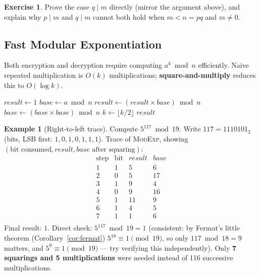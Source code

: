 \documentclass[11pt]{article}
\theoremstyle{definition}
\newtheorem{example}[theorem]{Example}
\newtheorem{exercise}[theorem]{Exercise}
\theoremstyle{remark}
\begin{document}
\begin{exercise}
Prove the case $q \mid m$ directly (mirror the argument above), and explain why $p \mid m$ and $q \mid m$ cannot both hold when $m < n = pq$ and $m \ne 0$.
\end{exercise}



\subsection{Fast Modular Exponentiation}\label{sec:modexp}
Both encryption and decryption require computing $a^{k} \bmod n$ efficiently. Naive repeated multiplication is $O(k)$ multiplications; \textbf{square-and-multiply} reduces this to $O(\log k)$.

\begin{algorithm}[h]
\caption{Square-and-Multiply (Right-to-Left, two variables)}\label{alg:modexp}
\begin{algorithmic}[1]
    \State $result \gets 1$
    \State $base \gets a \bmod n$
            \State $result \gets (result \times base) \bmod n$
        \EndIf
        \State $base \gets (base \times base) \bmod n$
        \State $k \gets \lfloor k / 2 \rfloor$
    \EndWhile
    \State \Return $result$
\EndFunction
\end{algorithmic}
\end{algorithm}

\begin{example}[Right-to-left trace]
Compute $5^{117} \bmod 19$. Write $117 = 1110101_2$ (bits, LSB first: $1,0,1,0,1,1,1$). Trace of \textsc{ModExp}, showing $(\text{bit consumed}, result, base \text{ after squaring})$:
\[
\begin{array}{c|ccc}
\text{step} & \text{bit} & result & base \\
\hline
1 & 1 & 5 & 6 \\
2 & 0 & 5 & 17 \\
3 & 1 & 9 & 4 \\
4 & 0 & 9 & 16 \\
5 & 1 & 11 & 9 \\
6 & 1 & 4 & 5 \\
7 & 1 & 1 & 6 \\
\end{array}
\]
Final result: $1$. Direct check: $5^{117} \bmod 19 = 1$ (consistent: by Fermat's little theorem (Corollary~\ref{cor:fermat}) $5^{18}\equiv1\pmod{19}$, so only $117 \bmod 18 = 9$ matters, and $5^9 \equiv 1 \pmod{19}$ --- try verifying this independently). Only \textbf{7 squarings and 5 multiplications} were needed instead of 116 successive multiplications.
\end{example}
\end{document}
